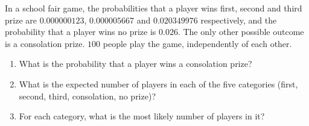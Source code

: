 In a school fair game, the probabilities that a player wins first, second and third prize are $0.000000123$, $0.000005667$ and $0.020349976$ respectively, and the probability that a player wins no prize is $0.026$. The only other possible outcome is a consolation prize. $100$ people play the game, independently of each other.
\begin{enumerate}
\item[(a)] What is the probability that a player wins a consolation prize?
\item[(b)] What is the expected number of players in each of the five categories (first, second, third, consolation, no prize)?
\item[(c)] For each category, what is the most likely number of players in it?
\end{enumerate}
